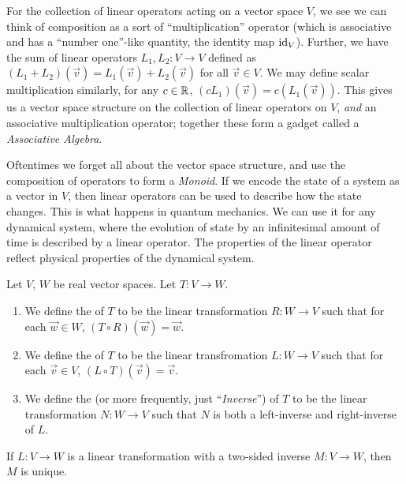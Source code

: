 \begin{remark}
For the collection of linear operators acting on a vector space $V$, we
see we can think of composition as a sort of ``multiplication''
operator (which is associative and has a ``number one''-like quantity,
the identity map $\mathrm{id}_{V}$). Further, we have the sum of linear
operators $L_{1},L_{2}\colon V\to V$ defined as
$(L_{1}+L_{2})(\vec{v})=L_{1}(\vec{v})+L_{2}(\vec{v})$ for all
$\vec{v}\in V$. We may define scalar multiplication similarly, for any
$c\in\mathbb{R}$, $(cL_{1})(\vec{v})=c\left(L_{1}(\vec{v})\right)$. This gives
us a vector space structure on the collection of linear operators on
$V$, \emph{and} an associative multiplication operator; together these
form a gadget called a \emph{Associative Algebra}.

Oftentimes we forget all about the vector space structure, and use the
composition of operators to form a \emph{Monoid}. If we encode the state
of a system as a vector in $V$, then linear operators can be used to
describe how the state changes. This is what happens in quantum mechanics.
We can use it for any dynamical system, where the evolution of state by
an infinitesimal amount of time is described by a linear operator. The
properties of the linear operator reflect physical properties of the
dynamical system.
\end{remark}

\begin{definition}
  Let $V$, $W$ be real vector spaces. Let $T\colon V\to W$.
  \begin{enumerate}
  \item We define the  of $T$ to be the linear
transformation $R\colon W\to V$ such that for each $\vec{w}\in W$,
$(T\circ R)(\vec{w})=\vec{w}$.
\item We define the  of $T$ to be the linear
  transfromation $L\colon W\to V$ such that for each $\vec{v}\in V$,
$(L\circ T)(\vec{v})=\vec{v}$.
\item We define the  (or more frequently, just
  ``\emph{Inverse\/}'') of $T$ to be the linear transformation $N\colon W\to V$
  such that $N$ is both a left-inverse and right-inverse of $L$.
  \end{enumerate}
\end{definition}

\begin{proposition}
If $L\colon V\to W$ is a linear transformation with a two-sided inverse
$M\colon V\to W$, then $M$ is unique.
\end{proposition}

